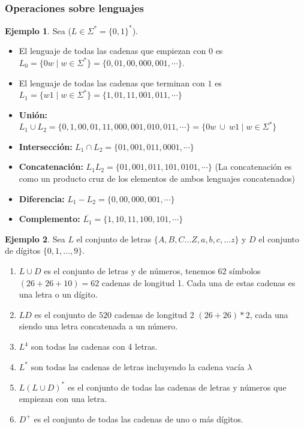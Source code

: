 \subsubsection{Operaciones sobre lenguajes}

\textbf{Ejemplo 1}. Sea ($L \in \Sigma^* = \{0,1\}^*$). 

\begin{itemize}
    \item El lenguaje de todas las cadenas que empiezan con $0$ es $L_0 = \{0w \mid w \in \Sigma^*\} = \{0,01,00, 000, 001, \cdots\}$.
    \item El lenguaje de todas las cadenas que terminan con $1$ es $L_1 = \{w1 \mid w \in \Sigma^*\} = \{1, 01, 11, 001, 011, \cdots\}$
\end{itemize}

\begin{itemize}
    \item \textbf{Unión:} $L_1 \cup L_2 = \{0,1,00, 01,11, 000, 001, 010, 011, \cdots\} = \{0w \ \cup \ w1 \mid w \in \Sigma^*\}$
    \item \textbf{Intersección:} $L_1 \cap L_2  = \{ 01, 001, 011, 0001, \cdots\} $
    \item \textbf{Concatenación:} $L_1L_2 = \{01,001,011,101,0101, \cdots\}$ (La concatenación es como un producto cruz de los elementos de ambos lenguajes concatenados)
    \item \textbf{Diferencia:} $L_1 - L_2 = \{0,00,000,001, \cdots\}$
    \item \textbf{Complemento:} $\overline{L_1} = \{1,10,11,100, 101, \cdots\}$
\end{itemize}
 
\textbf{Ejemplo 2}. Sea $L$ el conjunto de letras $\{A,B,C \dots Z, a,b,c, \dots z\}$ y $D$ el conjunto de dígitos $\{0,1, \dots , 9\}$.

\begin{enumerate}
    \item $L \cup D$ es el conjunto de letras y de números, tenemos $62$ símbolos $(26+26+10) = 62$ cadenas de longitud 1. Cada una de estas cadenas es una letra o un dígito. 
    \item $LD$ es el conjunto de $520$ cadenas de longitud 2 $(26 + 26)*2$, cada una siendo una letra concatenada a un número. 
    \item $L^4$ son todas las cadenas con 4 letras. 
    \item $L^*$ son todas las cadenas de letras incluyendo la cadena vacía $\lambda$
    \item $L(L \cup D)^*$ es el conjunto de todas las cadenas de letras y números que empiezan con una letra. 
    \item $D^{+}$ es el conjunto de todas las cadenas de uno o más dígitos.
\end{enumerate}

